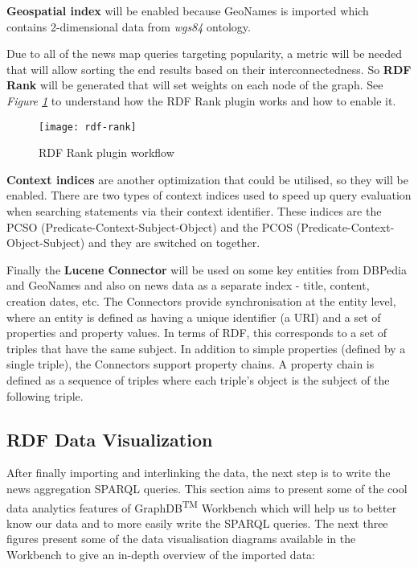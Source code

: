 \textbf{Geospatial index} will be enabled because GeoNames is imported which contains 2-dimensional data from \textit{wgs84} ontology.

Due to all of the news map queries targeting popularity,  a metric will be needed that will allow sorting the end results based on their interconnectedness. So \textbf{RDF Rank} will be generated that will set weights on each node of the graph. See \textit{Figure \ref{rdf-rank}} to understand how the RDF Rank plugin works and how to enable it.

\begin{figure}[h!]
    \texttt{[image: rdf-rank]}
    \caption{RDF Rank plugin workflow}
    \label{rdf-rank}
\end{figure}

\textbf{Context indices} are another optimization that could be utilised, so they will be enabled. There are two types of context indices used to speed up query evaluation when searching statements via their context identifier. These indices are the PCSO (Predicate-Context-Subject-Object) and the PCOS (Predicate-Context-Object-Subject) and they are switched on together.

Finally the \textbf{Lucene Connector} will be used on some key entities from DBPedia and GeoNames and also on news data as a separate index - title, content, creation dates, etc. The Connectors provide synchronisation at the entity level, where an entity is defined as having a unique identifier (a URI) and a set of properties and property values. In terms of RDF, this corresponds to a set of triples that have the same subject. In addition to simple properties (defined by a single triple), the Connectors support property chains. A property chain is defined as a sequence of triples where each triple’s object is the subject of the following triple.

\subsection{RDF Data Visualization}
After finally importing and interlinking the data, the next step is to write the news aggregation SPARQL queries. This section aims to present some of the cool data analytics features of GraphDB\textsuperscript{TM} Workbench which will help us to better know our data and to more easily write the SPARQL queries. The next three figures present some of the data visualisation diagrams available in the Workbench to give an in-depth overview of the imported data:

